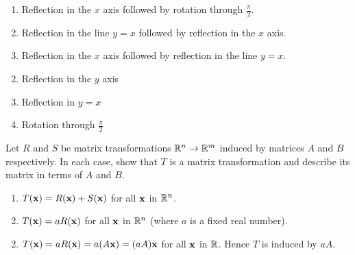 \begin{multicols}{2}
\begin{ex}
\begin{enumerate}[label={\alph*.}]
\item Reflection in the $x$ axis followed by rotation through $\frac{\pi}{2}$.

\item Reflection in the line $y = x$ followed by reflection in the $x$ axis.

\item Reflection in the $x$ axis followed by reflection in the line $y = x$.

\end{enumerate}
\begin{sol}
\begin{enumerate}[label={\alph*.}]
\setcounter{enumi}{1}
\item  Reflection in the $y$ axis

\setcounter{enumi}{3}
\item  Reflection in $y = x$

\setcounter{enumi}{5}
\item  Rotation through $\frac{\pi}{2}$

\end{enumerate}
\end{sol}
\end{ex}

\columnbreak
\begin{ex}
Let $R$ and $S$ be matrix transformations $\mathbb{R}^n \to \mathbb{R}^m$ induced by matrices $A$ and $B$ respectively. In each case, show that $T$ is a matrix transformation and describe its matrix in terms of $A$ and $B$.

\begin{enumerate}[label={\alph*.}]
\item $T(\textbf{x}) = R(\textbf{x}) + S(\textbf{x})$ for all $\textbf{x}$ in $\mathbb{R}^n$.

\item $T(\textbf{x}) = aR(\textbf{x})$ for all $\textbf{x}$ in $\mathbb{R}^n$ (where $a$ is a fixed real number).

\end{enumerate}
\begin{sol}
\begin{enumerate}[label={\alph*.}]
\setcounter{enumi}{1}
\item  $T(\textbf{x}) = aR(\textbf{x}) = a(A\textbf{x}) = (aA)\textbf{x}$ for all $\textbf{x}$ in $\mathbb{R}$. Hence $T$ is induced by $aA$.

\end{enumerate}
\end{sol}
\end{ex}


\end{multicols}
